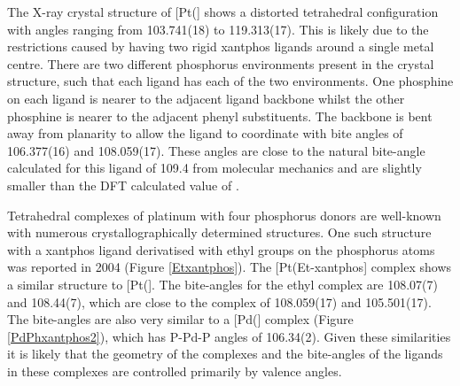 The X-ray crystal structure of [Pt(\Phthixantphos{}] shows a distorted tetrahedral configuration with angles ranging from 103.741(18) to 119.313(17)\degrees.  This is likely due to the restrictions caused by having two rigid xantphos ligands around a single metal centre.  There are two different phosphorus environments present in the crystal structure, such that each ligand has each of the two environments.  One phosphine on each ligand is nearer to the adjacent ligand backbone whilst the other phosphine is nearer to the adjacent phenyl substituents.  The backbone is bent away from planarity to allow the ligand to coordinate with bite angles of 106.377(16) and 108.059(17)\degrees. These angles are close to the natural bite-angle calculated for this ligand of 109.4\degrees{} from molecular mechanics and are slightly smaller than the DFT calculated value of \fixme{112.65\degrees}.\cite{Birkholz2009}

Tetrahedral complexes of platinum with four phosphorus donors are well-known with numerous crystallographically determined structures.\cite{Allen2002}  One such structure with a xantphos ligand derivatised with ethyl groups on the phosphorus atoms was reported in 2004 (Figure \ref{Etxantphos}).\cite{Miedaner2004}  The [Pt(Et-xantphos] complex shows a similar structure to [Pt(\Phthixantphos{}].  The bite-angles for the ethyl complex are 108.07(7) and 108.44(7)\degrees, which are close to the \Phthixantphos{} complex of 108.059(17) and 105.501(17)\degrees.  The bite-angles are also very similar to a [Pd(\Phxantphos{}] complex (Figure \ref{PdPhxantphos2}), which has P-Pd-P angles of 106.34(2)\degrees{}.\cite{Grushin2006} Given these similarities it is likely that the geometry of the complexes and the bite-angles of the ligands in these complexes are controlled primarily by valence angles. 



